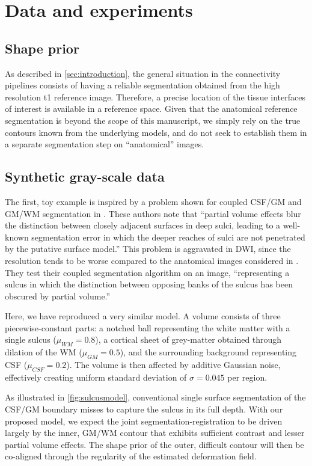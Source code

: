 \section{Data and experiments}
\label{sec:experiments}
%
\subsection{Shape prior}
%
As described in \autoref{sec:introduction}, the general situation in
the connectivity pipelines consists of having 
a reliable segmentation obtained from the high resolution \ac{t1} 
reference image. Therefore, a precise location of the tissue interfaces
of interest is available in a reference space. Given that the anatomical 
reference segmentation is beyond the scope of this manuscript, we simply 
rely on the true contours known from the underlying models, and do not seek to establish them in a separate segmentation step on ``anatomical'' images.
%
\subsection{Synthetic gray-scale data}
%
The first, toy example is inspired by a problem shown for coupled CSF/GM and GM/WM segmentation in \citep{macdonald_automated_2000}. These authors note that ``partial volume effects blur the distinction between closely adjacent surfaces in deep sulci, leading to a well-known segmentation error in which the deeper reaches of sulci are not penetrated by the putative surface model.'' This problem is aggravated in DWI, since the resolution tends to be worse compared to the anatomical images considered in \citep{macdonald_automated_2000}. They test their coupled segmentation algorithm on an image, ``representing a sulcus in which the distinction between opposing banks of the sulcus has been obscured by partial volume.''  

Here, we have reproduced a very similar model. A volume consists of three piecewise-constant parts: a notched ball representing the white matter with a single sulcus ($\mu_{WM} = 0.8$), a cortical sheet of grey-matter obtained through dilation of the WM ($\mu_{GM} = 0.5$), and the surrounding background representing CSF ($\mu_{CSF} = 0.2$). The volume is then affected by additive Gaussian noise, effectively creating uniform standard deviation of $\sigma = 0.045$ per region.

As illustrated in \autoref{fig:sulcusmodel}, conventional single surface segmentation of the CSF/GM boundary misses to capture the sulcus in its full depth. With our proposed model, we expect the joint segmentation-registration to be driven largely by the inner, GM/WM contour that exhibits sufficient contrast and lesser partial volume effects. The shape prior of the outer, difficult contour will then be co-aligned through the regularity of the estimated deformation field.

